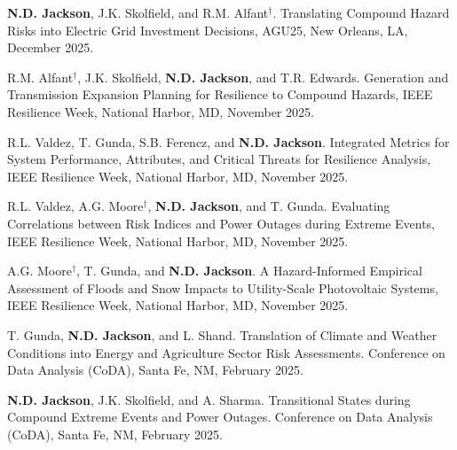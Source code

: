 \documentclass{article}[12pt]
\begin{document}
	\begin{etaremune}[]
		
		
		\item \textbf{N.D. Jackson}, J.K. Skolfield, and R.M. Alfant$^{\dagger}$. Translating Compound Hazard Risks into Electric Grid Investment Decisions, AGU25, New Orleans, LA, December 2025. 
		
		\item R.M. Alfant$^{\dagger}$, J.K. Skolfield, \textbf{N.D. Jackson}, and T.R. Edwards. Generation and Transmission Expansion Planning for Resilience to Compound Hazards, IEEE Resilience Week, National Harbor, MD, November 2025. 
		
		\item R.L. Valdez, T. Gunda, S.B. Ferencz, and \textbf{N.D. Jackson}. Integrated Metrics for System Performance, Attributes, and Critical Threats for Resilience Analysis, IEEE Resilience Week, National Harbor, MD, November 2025. 
		
		\item R.L. Valdez, A.G. Moore$^{\dagger}$, \textbf{N.D. Jackson}, and T. Gunda. Evaluating Correlations between Risk Indices and Power Outages during Extreme Events, IEEE Resilience Week, National Harbor, MD, November 2025. 
		
		\item A.G. Moore$^{\dagger}$, T. Gunda, and \textbf{N.D. Jackson}. A Hazard-Informed Empirical Assessment of Floods and Snow Impacts to Utility-Scale Photovoltaic Systems, IEEE Resilience Week, National Harbor, MD, November 2025. 
		
		\item T. Gunda, \textbf{N.D. Jackson}, and L. Shand. Translation of Climate and Weather Conditions into Energy and Agriculture Sector Risk Assessments. Conference on Data Analysis (CoDA), Santa Fe, NM, February 2025. 
		
		\item \textbf{N.D. Jackson}, J.K. Skolfield, and A. Sharma. Transitional States during Compound Extreme Events and Power Outages. Conference on Data Analysis (CoDA), Santa Fe, NM, February 2025. 
		

\end{etaremune}
\end{document}
